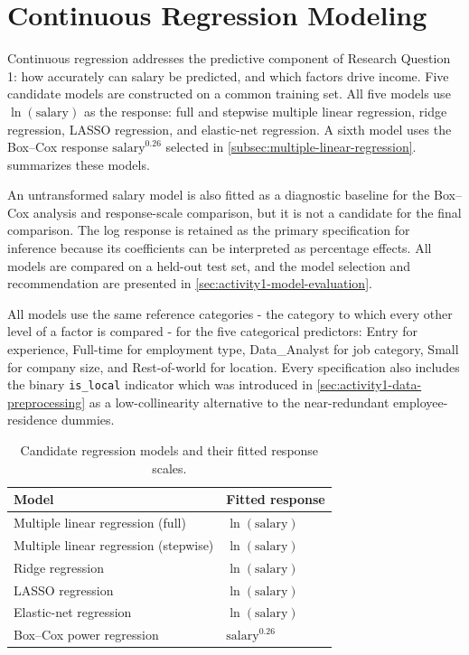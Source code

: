 \section{Continuous Regression Modeling}
\label{sec:activity1-continuous-regression}

Continuous regression addresses the predictive component of Research Question 1:
how accurately can salary be predicted, and which factors drive income. Five
candidate models are constructed on a common training set. All five models use
$\ln(\mathrm{salary})$ as the response: full and stepwise
multiple linear regression, ridge regression, LASSO
regression, and elastic-net regression. A sixth model uses the Box--Cox response
$\mathrm{salary}^{0.26}$ selected in \cref{subsec:multiple-linear-regression}.
 summarizes these models.

An untransformed salary model is also fitted as a diagnostic baseline for the
Box--Cox analysis and response-scale comparison, but it is not a candidate for the
final comparison. The log response is retained as the primary specification for
inference because its coefficients can be interpreted as percentage effects. All
models are compared on a held-out test set, and the model selection and
recommendation are presented in \cref{sec:activity1-model-evaluation}.

All models use the same reference categories - the category to which every
other level of a factor is compared - for the five categorical predictors: Entry
for experience, Full-time for employment type, Data\_Analyst for job
category, Small for company size, and Rest-of-world for location. Every
specification also includes the binary \texttt{is\_local} indicator which was
introduced in \cref{sec:activity1-data-preprocessing} as a low-collinearity
alternative to the near-redundant employee-residence dummies.

\begin{table}[htbp]
    \centering
    \caption{Candidate regression models and their fitted response scales.}
    \label{tab:model-overview}
    \small
    \begin{tabular}{ll}
        \toprule
        \textbf{Model} & \textbf{Fitted response} \\
        \midrule
        Multiple linear regression (full)     & $\ln(\mathrm{salary})$ \\
        Multiple linear regression (stepwise) & $\ln(\mathrm{salary})$ \\
        Ridge regression                      & $\ln(\mathrm{salary})$ \\
        LASSO regression                      & $\ln(\mathrm{salary})$ \\
        Elastic-net regression                & $\ln(\mathrm{salary})$ \\
        Box--Cox power regression             & $\mathrm{salary}^{0.26}$ \\
        \bottomrule
    \end{tabular}
\end{table}

